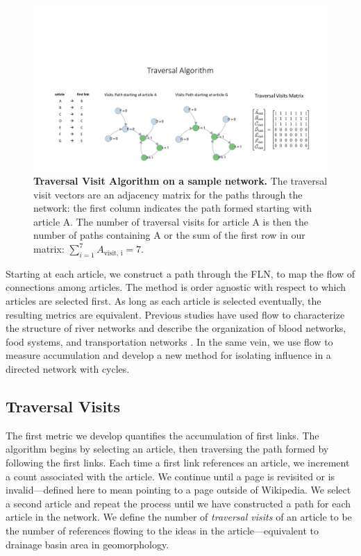\documentclass[pre,twocolumn,twoside,superscriptaddress,floatfix]{revtex4-1}
\begin{document}
{\begin{figure}[tp!]
  \includegraphics[width=\textwidth]{fig002_traversal_visit_algo_figure.pdf}  
  \caption{
    \textbf{Traversal Visit Algorithm on a sample network.}
     The traversal visit vectors are an adjacency matrix for the paths through the network: 
     the first column indicates the path formed starting with article A. 
     The number of traversal visits for article A is then the number of paths containing A 
     or the sum of the first row in our matrix:
     $\sum_{i=1}^7 A_{\text{visit, i}} = 7$.
  }
  \label{fig:Traversal Visits}
\end{figure}
Starting at each article, we construct a path through the FLN, 
to map the flow of connections among articles.
The method is order agnostic with respect to which articles are selected first. As long as each article is selected eventually, the resulting metrics are equivalent.
Previous studies have used flow to characterize the structure of river networks
\cite{horton1945erosional, dodds1999unified} and describe the organization of 
blood networks, food systems, and transportation networks
\cite{garlaschelli2003universal}. 
In the same vein, we use flow to measure accumulation and develop a new method for isolating influence in a directed network with cycles.

\subsection{Traversal Visits}
\label{Traversal Visits}

The first metric we develop quantifies the accumulation of first links.
The algorithm begins by selecting an article, then traversing the path formed
by following the first links. Each time a first link references an article, we increment a count
associated with the article. 
We continue until a page is revisited or is invalid---defined here to mean pointing to a page outside of Wikipedia.
We select a second article and repeat the process until we have 
constructed a path for each article in the network. 
We define the number of {\it traversal visits} of an article 
to be the number of references flowing to the ideas in the article---equivalent
to drainage basin area in geomorphology. 

}
\end{document}
